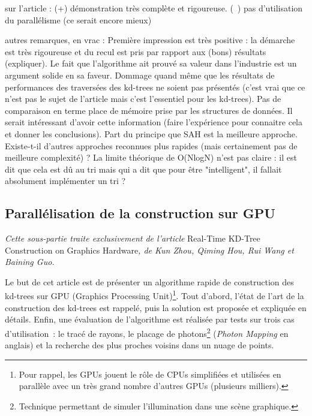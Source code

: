 \documentclass[a4paper]{article}
\begin{document}
sur l'article :
(+) démonstration très complète et rigoureuse.
(~) pas d'utilisation du parallélisme (ce serait encore mieux)

autres remarques, en vrac :
Première impression est très positive : la démarche est très rigoureuse et du recul est pris par rapport aux (bons) résultats (expliquer). Le fait que l'algorithme ait prouvé sa valeur dans l'industrie est un argument solide en sa faveur. Dommage quand même que les résultats de performances des traversées des kd-trees ne soient pas présentés (c'est vrai que ce n'est pas le sujet de l'article mais c'est l'essentiel pour les kd-trees).
	Pas de comparaison en terme place de mémoire prise par les structures de données. Il serait intéressant d'avoir cette information (faire l'expérience pour connaitre cela et donner les conclusions).
	Part du principe que SAH est la meilleure approche. Existe-t-il d'autres approches reconnues plus rapides (mais certainement pas de meilleure complexité) ?
	La limite théorique de O(NlogN) n'est pas claire : il est dit que cela est dû au tri mais qui a dit que pour être "intelligent", il fallait absolument implémenter un tri ?
	

\subsection{Parallélisation de la construction sur GPU}

\textit{Cette sous-partie traite exclusivement de l'article} Real-Time KD-Tree Construction on Graphics Hardware\textit{, de Kun Zhou, Qiming Hou, Rui Wang et Baining Guo.}

Le but de cet article est de présenter un algorithme rapide de construction des kd-trees sur GPU (Graphics Processing Unit)\footnote{Pour rappel, les GPUs jouent le rôle de CPUs simplifiées et utilisées en parallèle avec un très grand nombre d'autres GPUs (plusieurs milliers).}. Tout d'abord, l'état de l'art de la construction des kd-trees est rappelé, puis la solution est proposée et expliquée en détails. Enfin, une évaluation de l'algorithme est réalisée par tests sur trois cas d'utilisation~: le tracé de rayons, le placage de photons\footnote{Technique permettant de simuler l'illumination dans une scène graphique.} (\textit{Photon Mapping} en anglais) et la recherche des plus proches voisins dans un nuage de points.
\end{document}
